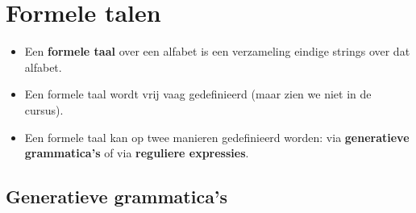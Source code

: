 \section{Formele talen}
\begin{itemize}
    \item Een \textbf{formele taal} over een alfabet is een verzameling eindige strings over dat alfabet.
    \item Een formele taal wordt vrij vaag gedefinieerd (maar zien we niet in de cursus).
    \item Een formele taal kan op twee manieren gedefinieerd worden: via \textbf{generatieve grammatica's} of via \textbf{reguliere expressies}.
\end{itemize}

\subsection{Generatieve grammatica's}
